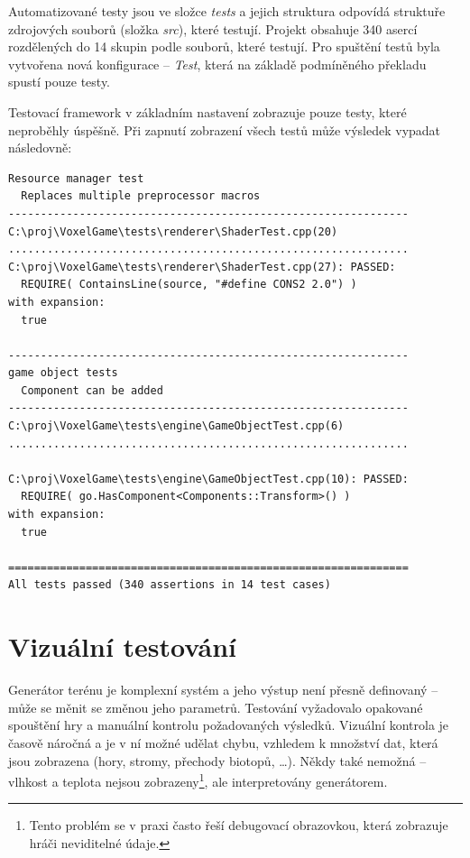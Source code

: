 \documentclass[thesis=M,czech]{FITthesis}[2019/12/23]
\begin{document}
Automatizované testy jsou ve složce \textit{tests} a jejich struktura odpovídá struktuře zdrojových souborů (složka \textit{src}), které testují. Projekt obsahuje 340 asercí rozdělených do 14 skupin podle souborů, které testují. Pro spuštění testů byla vytvořena nová konfigurace -- \textit{Test}, která na základě podmíněného překladu spustí pouze testy.

Testovací framework v základním nastavení zobrazuje pouze testy, které neproběhly úspěšně. Při zapnutí zobrazení všech testů může výsledek vypadat následovně:

\begin{verbatim}
Resource manager test
  Replaces multiple preprocessor macros
--------------------------------------------------------------
C:\proj\VoxelGame\tests\renderer\ShaderTest.cpp(20)
..............................................................
C:\proj\VoxelGame\tests\renderer\ShaderTest.cpp(27): PASSED:
  REQUIRE( ContainsLine(source, "#define CONS2 2.0") )
with expansion:
  true

--------------------------------------------------------------
game object tests
  Component can be added
--------------------------------------------------------------
C:\proj\VoxelGame\tests\engine\GameObjectTest.cpp(6)
..............................................................

C:\proj\VoxelGame\tests\engine\GameObjectTest.cpp(10): PASSED:
  REQUIRE( go.HasComponent<Components::Transform>() )
with expansion:
  true

==============================================================
All tests passed (340 assertions in 14 test cases)
\end{verbatim}

\section{Vizuální testování}

Generátor terénu je komplexní systém a jeho výstup není přesně definovaný -- může se měnit se změnou jeho parametrů. Testování vyžadovalo opakované spouštění hry a manuální kontrolu požadovaných výsledků. Vizuální kontrola je časově náročná a je v ní možné udělat chybu, vzhledem k množství dat, která jsou zobrazena (hory, stromy, přechody biotopů, \dots). Někdy také nemožná -- vlhkost a teplota nejsou zobrazeny\footnote{Tento problém se v praxi často řeší debugovací obrazovkou, která zobrazuje hráči neviditelné údaje.}, ale interpretovány generátorem.
\end{document}
